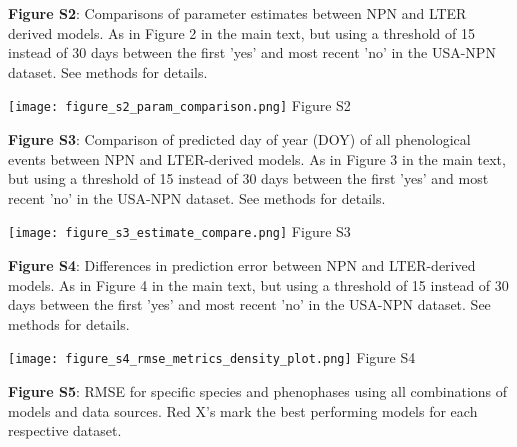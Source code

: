 \documentclass[a4paper,12pt]{article}
\begin{document}
\newpage

\newpage

\textbf{Figure S2}: Comparisons of parameter estimates between NPN and LTER derived models. As in Figure 2 in the main text, but using a threshold of 15 instead of 30 days between the first 'yes' and most recent 'no' in the USA-NPN dataset. See methods for details. 

\newpage

\begin{center}
	\centering
		\texttt{[image: figure\_s2\_param\_comparison.png]}
	Figure S2
\end{center}

\newpage

\newpage

\textbf{Figure S3}: Comparison of predicted day of year (DOY) of all phenological events between NPN
and LTER-derived models. As in Figure 3 in the main text, but using a threshold of 15 instead of 30 days between the first 'yes' and most recent 'no' in the USA-NPN dataset. See methods for details. 

\newpage

\begin{center}
	\centering
		\texttt{[image: figure\_s3\_estimate\_compare.png]}
	Figure S3
\end{center}

\newpage

\newpage

\textbf{Figure S4}: Differences in prediction error between NPN and LTER-derived models. As in Figure 4 in the main text, but using a threshold of 15 instead of 30 days between the first 'yes' and most recent 'no' in the USA-NPN dataset. See methods for details. 

\newpage

\begin{center}
	\centering
		\texttt{[image: figure\_s4\_rmse\_metrics\_density\_plot.png]}
	Figure S4
\end{center}

\newpage

\newpage

\textbf{Figure S5}: RMSE for specific species and phenophases using all combinations of models and data sources. Red X's mark the best performing models for each respective dataset. 
\end{document}
